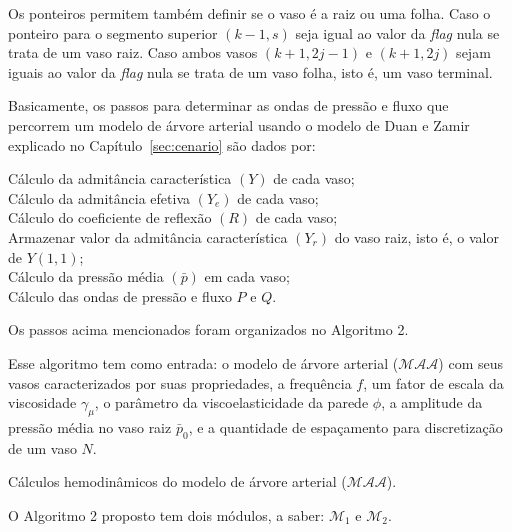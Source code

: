 Os ponteiros permitem também definir se o vaso é a raiz ou uma folha. Caso o ponteiro para o segmento superior $(k-1,s)$ seja igual ao valor da \textit{flag} nula se trata de um vaso raiz. Caso ambos vasos  $(k+1,2j-1)$ e $(k+1,2j)$ sejam iguais ao valor da \textit{flag} nula se trata de um vaso folha, isto é, um vaso terminal.

Basicamente, os passos para determinar as ondas de pressão e fluxo que percorrem um modelo de árvore arterial usando o modelo de Duan e Zamir explicado no Capítulo~\ref{sec:cenario} são dados por:

\begin{algorithm}[H]
	\SetAlgoLined
		Cálculo da admitância característica $(Y)$ de cada vaso;\\
		Cálculo da admitância efetiva $(Y_e)$  de cada vaso;\\
		Cálculo do coeficiente de reflexão $(R)$  de cada vaso; \\
		Armazenar valor da admitância característica $(Y_r)$ do vaso raiz, isto é, o valor de $Y(1,1)$;\\
		Cálculo da pressão média $(\bar{p})$ em cada vaso;\\
		Cálculo das ondas de pressão e fluxo $P$ e $Q$.
	\label{algsimples}
\end{algorithm}

Os passos acima mencionados foram organizados no Algoritmo 2.

 Esse algoritmo tem como entrada: o modelo de árvore arterial ($\mathcal{MAA}$) com seus vasos caracterizados por suas propriedades, a frequência $f$, um fator de escala da viscosidade $\gamma_{\mu}$, o parâmetro da viscoelasticidade da parede $\phi$, a amplitude da pressão média no vaso raiz $\bar{p}_0$, e a quantidade de espaçamento para discretização de um vaso $N$.

\begin{algorithm}[H]
	\SetAlgoLined
	\label{Alg2}
	\caption{Cálculos hemodinâmicos do modelo de árvore arterial ($\mathcal{MAA}$).}
\end{algorithm}

O Algoritmo 2 proposto tem dois módulos, a saber: $\mathcal{M}_1$ e $\mathcal{M}_2$.

